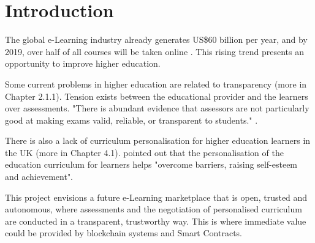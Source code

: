 
\chapter{Introduction}  %



The global e-Learning industry already generates US\$60 billion per year, and by 2019, over half of all courses will be taken
online \citep[p.17]{panto2013challenge}. This rising trend presents an opportunity to improve higher education.

Some current problems in higher education are related to transparency (more in Chapter 2.1.1). Tension exists between
the educational provider and the learners over assessments. "There is abundant evidence that assessors are not particularly
good at making exams valid, reliable, or transparent to students." \citep[p.62]{brown1999assessment}.


There is also a lack of curriculum personalisation for higher education learners in the UK (more in Chapter 4.1).
\citet{condie2007impact} pointed out that the personalisation of the education curriculum for learners helps "overcome
barriers, raising self-esteem and achievement".

This project envisions a future e-Learning marketplace that is open, trusted and autonomous, where
assessments and the negotiation of personalised curriculum are conducted in a transparent, trustworthy way.
This is where immediate value could be provided by blockchain systems and Smart Contracts.

